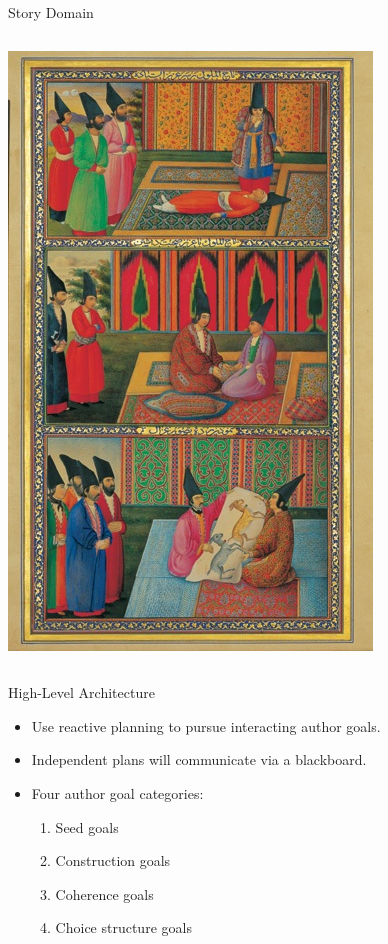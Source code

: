 \documentclass[xcolor=x11names]{beamer}
\begin{document}
\begin{frame}{Story Domain}
\begin{columns}[T]
\begin{column}{.4\textwidth}
\begin{block}{}
\includegraphics[height=0.8\textheight]{res/1001nights-illustration.jpg}
      \end{block}
    \end{column}
  \end{columns}
\end{frame}

\begin{frame}{High-Level Architecture}
  \begin{itemize}
    \item Use reactive planning to pursue interacting author goals.
    \item Independent plans will communicate via a blackboard.
    \pause
    \item Four author goal categories:
    \begin{enumerate}
      \item Seed goals
      \item Construction goals
      \item Coherence goals
      \item Choice structure goals
    \end{enumerate}
  \end{itemize}
\end{frame}
\end{document}
